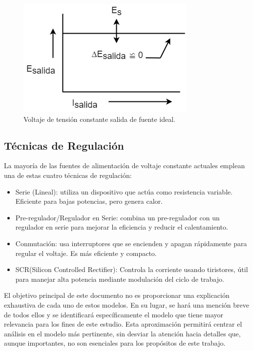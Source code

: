 \begin{figure}
    \centering
    \includegraphics[scale=0.5]{./imagenes/salidaidealfuentedc.jpg}
    \caption{Voltaje de tensión constante salida de fuente ideal.}
    \label{F:salidaidealfuentedc}
\end{figure}

\subsection{Técnicas de Regulación}\par 
La mayoría de las fuentes de alimentación de voltaje constante actuales emplean una de estas cuatro técnicas de regulación:
\begin{itemize}
    \item Serie (Lineal): utiliza un dispositivo que actúa como resistencia variable. Eficiente para bajas potencias, pero genera calor.
    \item Pre-regulador/Regulador en Serie: combina un pre-regulador con un regulador en serie para mejorar la eficiencia y reducir el calentamiento.
    \item Conmutación: usa interruptores que se encienden y apagan rápidamente para regular el voltaje. Es más eficiente y compacto.
    \item SCR(Silicon Controlled Rectifier): Controla la corriente usando tiristores, útil para manejar alta potencia mediante modulación del ciclo de trabajo.
\end{itemize}\par 

El objetivo principal de este documento no es proporcionar una explicación exhaustiva de cada uno de estos modelos. En su lugar, se hará una mención breve de todos ellos y se identificará específicamente el modelo que tiene mayor relevancia para los fines de este estudio. Esta aproximación permitirá centrar el análisis en el modelo más pertinente, sin desviar la atención hacia detalles que, aunque importantes, no son esenciales para los propósitos de este trabajo.


